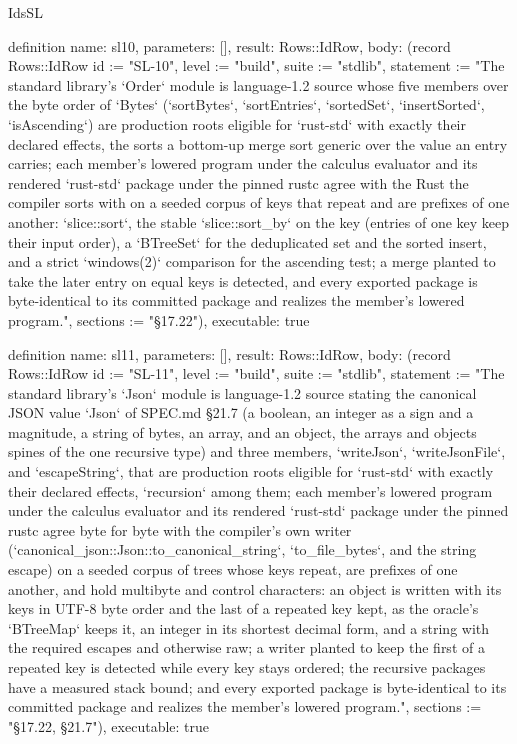 \begin{lexlean}{IdsSL}
\begin{semanticmodule}
definition{
  name: sl10,
  parameters: [],
  result: Rows::IdRow,
  body: (record Rows::IdRow {id := "SL-10", level := "build", suite := "stdlib", statement := "The standard library's `Order` module is language-1.2 source whose five members over the byte order of `Bytes` (`sortBytes`, `sortEntries`, `sortedSet`, `insertSorted`, `isAscending`) are production roots eligible for `rust-std` with exactly their declared effects, the sorts a bottom-up merge sort generic over the value an entry carries; each member's lowered program under the calculus evaluator and its rendered `rust-std` package under the pinned rustc agree with the Rust the compiler sorts with on a seeded corpus of keys that repeat and are prefixes of one another: `slice::sort`, the stable `slice::sort_by` on the key (entries of one key keep their input order), a `BTreeSet` for the deduplicated set and the sorted insert, and a strict `windows(2)` comparison for the ascending test; a merge planted to take the later entry on equal keys is detected, and every exported package is byte-identical to its committed package and realizes the member's lowered program.", sections := "§17.22"}),
  executable: true
}

definition{
  name: sl11,
  parameters: [],
  result: Rows::IdRow,
  body: (record Rows::IdRow {id := "SL-11", level := "build", suite := "stdlib", statement := "The standard library's `Json` module is language-1.2 source stating the canonical JSON value `Json` of SPEC.md §21.7 (a boolean, an integer as a sign and a magnitude, a string of bytes, an array, and an object, the arrays and objects spines of the one recursive type) and three members, `writeJson`, `writeJsonFile`, and `escapeString`, that are production roots eligible for `rust-std` with exactly their declared effects, `recursion` among them; each member's lowered program under the calculus evaluator and its rendered `rust-std` package under the pinned rustc agree byte for byte with the compiler's own writer (`canonical_json::Json::to_canonical_string`, `to_file_bytes`, and the string escape) on a seeded corpus of trees whose keys repeat, are prefixes of one another, and hold multibyte and control characters: an object is written with its keys in UTF-8 byte order and the last of a repeated key kept, as the oracle's `BTreeMap` keeps it, an integer in its shortest decimal form, and a string with the required escapes and otherwise raw; a writer planted to keep the first of a repeated key is detected while every key stays ordered; the recursive packages have a measured stack bound; and every exported package is byte-identical to its committed package and realizes the member's lowered program.", sections := "§17.22, §21.7"}),
  executable: true
}


\end{semanticmodule}
\end{lexlean}

